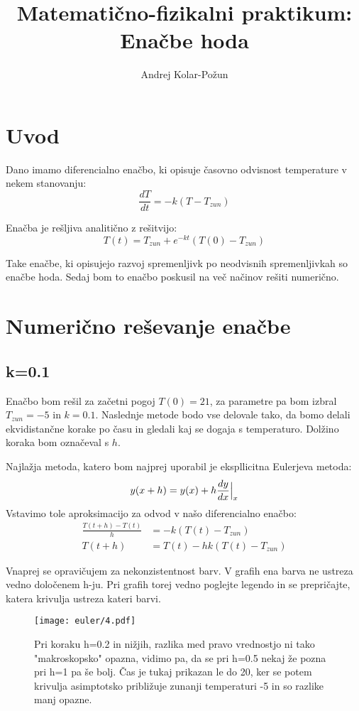 \documentclass{article}
\title{Matemati{\v c}no-fizikalni praktikum: Ena{\v c}be hoda}
\author{Andrej Kolar-Po{\v z}un}
\begin{document}
\maketitle
\newpage
{}

\section{Uvod}

Dano imamo diferencialno enačbo, ki opisuje časovno odvisnost temperature v nekem stanovanju:
\begin{equation*}
\frac{dT}{dt} = -k(T-T_{zun})
\end{equation*}

Enačba je rešljiva analitično z rešitvijo:
\begin{equation*}
T(t)=T_{zun} + e^{-kt}(T(0) - T_{zun})
\end{equation*}

Take enačbe, ki opisujejo razvoj spremenljivk po neodvisnih spremenljivkah so enačbe hoda.
Sedaj bom to enačbo poskusil na več načinov rešiti numerično.

\newpage

\section{Numerično reševanje enačbe}

\subsection{k=0.1}
Enačbo bom rešil za začetni pogoj $T(0) = 21$, za parametre pa bom izbral $T_{zun} = -5$ in $k=0.1$.
Naslednje metode bodo vse delovale tako, da bomo delali ekvidistančne korake po času in gledali kaj se dogaja s temperaturo.
Dolžino koraka bom označeval s $h$.

Najlažja metoda, katero bom najprej uporabil je ekspllicitna Eulerjeva metoda:
\begin{equation*}
y(x+h) = y(x) + h \frac{dy}{dx}\Big{|}_x 
\end{equation*}
Vstavimo tole aproksimacijo za odvod v našo diferencialno enačbo:
\begin{align*}
\frac{T(t+h)-T(t)}{h} &= -k(T(t) - T_{zun}) \\
T(t+h) &= T(t) - hk(T(t) - T_{zun}) 
\end{align*}

Vnaprej se opravičujem za nekonzistentnost barv. V grafih ena barva ne ustreza vedno določenem h-ju. Pri grafih torej vedno poglejte legendo in se prepričajte, katera krivulja ustreza kateri barvi.
\begin{figure}[H]
\centering
\texttt{[image: euler/4.pdf]}
\caption*{Pri koraku h=0.2 in nižjih, razlika med pravo vrednostjo ni tako "makroskopsko" opazna, vidimo pa, da se pri h=0.5 nekaj že pozna pri h=1 pa še bolj. Čas je tukaj prikazan le do 20, ker se potem krivulja asimptotsko približuje zunanji temperaturi -5 in so razlike manj opazne.}
\end{figure}
\end{document}
